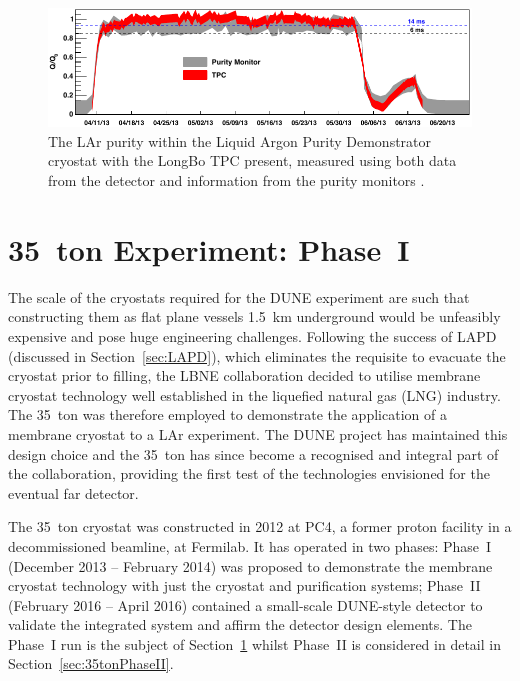 \begin{figure}
  \centering
  \includegraphics[width=14cm]{LongBoPurity.pdf}
  \caption[The LAr purity within the Liquid Argon Purity Demonstrator cryostat with the LongBo TPC present, measured using both data from the detector and information from the purity monitors.]{The LAr purity within the Liquid Argon Purity Demonstrator cryostat with the LongBo TPC present, measured using both data from the detector and information from the purity monitors \cite{LongBo2015}.}
  \label{fig:LongBoPurity}
\end{figure}

\section{35~ton Experiment: Phase~I}\label{sec:35tonPhaseI}

The scale of the cryostats required for the DUNE experiment are such that constructing them as flat plane vessels 1.5~km underground would be unfeasibly expensive and pose huge engineering challenges.  Following the success of LAPD (discussed in Section~\ref{sec:LAPD}), which eliminates the requisite to evacuate the cryostat prior to filling, the LBNE collaboration decided to utilise membrane cryostat technology well established in the liquefied natural gas (LNG) industry.  The 35~ton \cite{35tonPhaseI2014Cryostat,35tonPhaseI2014,35tonPhaseI2015} was therefore employed to demonstrate the application of a membrane cryostat to a LAr experiment.  The DUNE project has maintained this design choice and the 35~ton has since become a recognised and integral part of the collaboration, providing the first test of the technologies envisioned for the eventual far detector.

The 35~ton cryostat was constructed in 2012 at PC4, a former proton facility in a decommissioned beamline, at Fermilab.  It has operated in two phases: Phase~I (December 2013 -- February 2014) was proposed to demonstrate the membrane cryostat technology with just the cryostat and purification systems; Phase~II (February 2016 -- April 2016) contained a small-scale DUNE-style detector to validate the integrated system and affirm the detector design elements.  The Phase~I run is the subject of Section~\ref{sec:35tonPhaseI} whilst Phase~II is considered in detail in Section~\ref{sec:35tonPhaseII}.


